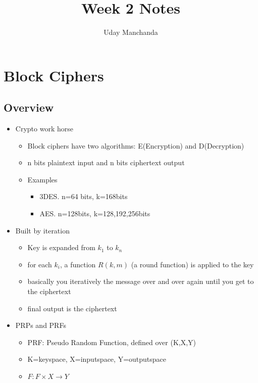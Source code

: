 \documentclass[]{article}
\title{Week 2 Notes}
\author{Uday Manchanda}
\begin{document}
\maketitle

\begin{abstract}
\end{abstract}

\section{Block Ciphers}
\subsection{Overview}
\begin{itemize}
    \item Crypto work horse
    \begin{itemize}
        \item Block ciphers have two algorithms: E(Encryption) and D(Decryption)
        \item n bits plaintext input and n bits ciphertext output
        \item Examples
        \begin{itemize}
            \item 3DES. n=64 bits, k=168bits
            \item AES. n=128bits, k=128,192,256bits
        \end{itemize}
    \end{itemize}
    \item Built by iteration
    \begin{itemize}
        \item Key is expanded from $k_{1}$ to $k_{n}$
        \item for each $k_{i}$, a function $R(k,m)$ (a round function) is applied to the key
        \item basically you iteratively the message over and over again until you get to the ciphertext
        \item final output is the ciphertext
    \end{itemize}
    \item PRPs and PRFs
    \begin{itemize}
        \item PRF: Pseudo Random Function, defined over (K,X,Y)
        \item K=keyspace, X=inputspace, Y=outputspace
        \item $F: F \times X \rightarrow Y$

\end{itemize}
\end{itemize}
\end{document}
